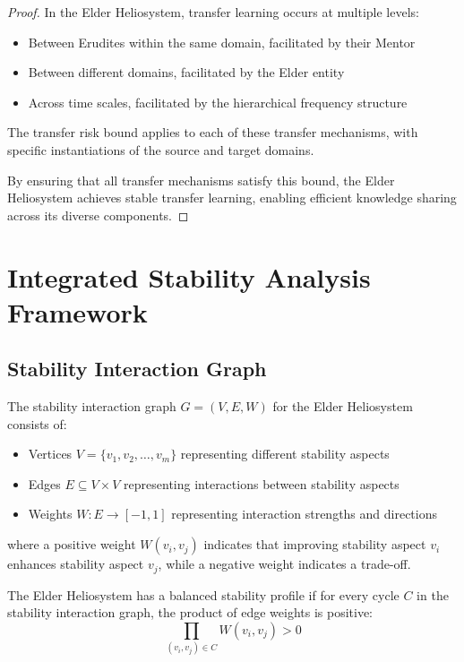 \begin{proof}
In the Elder Heliosystem, transfer learning occurs at multiple levels:
\begin{itemize}
    \item Between Erudites within the same domain, facilitated by their Mentor
    \item Between different domains, facilitated by the Elder entity
    \item Across time scales, facilitated by the hierarchical frequency structure
\end{itemize}

The transfer risk bound applies to each of these transfer mechanisms, with specific instantiations of the source and target domains.

By ensuring that all transfer mechanisms satisfy this bound, the Elder Heliosystem achieves stable transfer learning, enabling efficient knowledge sharing across its diverse components.
\end{proof}

\section{Integrated Stability Analysis Framework}

\subsection{Stability Interaction Graph}

\begin{definition}
The stability interaction graph $G = (V, E, W)$ for the Elder Heliosystem consists of:
\begin{itemize}
    \item Vertices $V = \{v_1, v_2, \ldots, v_m\}$ representing different stability aspects
    \item Edges $E \subseteq V \times V$ representing interactions between stability aspects
    \item Weights $W: E \rightarrow [-1, 1]$ representing interaction strengths and directions
\end{itemize}
where a positive weight $W(v_i, v_j)$ indicates that improving stability aspect $v_i$ enhances stability aspect $v_j$, while a negative weight indicates a trade-off.
\end{definition}

\begin{theorem}
The Elder Heliosystem has a balanced stability profile if for every cycle $C$ in the stability interaction graph, the product of edge weights is positive:
\begin{equation}
\prod_{(v_i, v_j) \in C} W(v_i, v_j) > 0
\end{equation}
\end{theorem}

